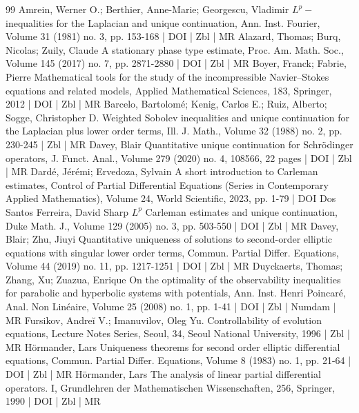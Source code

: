 \documentclass[10pt]{amsart}
\theoremstyle{definition}\newtheorem{defi}[theo]{Definition}\newtheorem{rema}[theo]{Remark}\newtheorem{exam}[theo]{Example}\newtheorem{exem}[theo]{Example}\newtheorem{nota}[theo]{Notation}
\begin{document}
\begin{thebibliography}{99}
 Amrein, Werner O.; Berthier, Anne-Marie; Georgescu, Vladimir ${L}^ p-$inequalities for the Laplacian and unique continuation, Ann. Inst. Fourier, Volume 31 (1981) no. 3, pp. 153-168 | DOI | Zbl | MR
 Alazard, Thomas; Burq, Nicolas; Zuily, Claude A stationary phase type estimate, Proc. Am. Math. Soc., Volume 145 (2017) no. 7, pp. 2871-2880 | DOI | Zbl | MR
 Boyer, Franck; Fabrie, Pierre Mathematical tools for the study of the incompressible Navier–Stokes equations and related models, Applied Mathematical Sciences, 183, Springer, 2012 | DOI | Zbl | MR
 Barcelo, Bartolomé; Kenig, Carlos E.; Ruiz, Alberto; Sogge, Christopher D. Weighted Sobolev inequalities and unique continuation for the Laplacian plus lower order terms, Ill. J. Math., Volume 32 (1988) no. 2, pp. 230-245 | Zbl | MR
 Davey, Blair Quantitative unique continuation for Schrödinger operators, J. Funct. Anal., Volume 279 (2020) no. 4, 108566, 22 pages | DOI | Zbl | MR
 Dardé, Jérémi; Ervedoza, Sylvain A short introduction to Carleman estimates, Control of Partial Differential Equations (Series in Contemporary Applied Mathematics), Volume 24, World Scientific, 2023, pp. 1-79 | DOI
 Dos Santos Ferreira, David Sharp ${L}^p$ Carleman estimates and unique continuation, Duke Math. J., Volume 129 (2005) no. 3, pp. 503-550 | DOI | Zbl | MR
 Davey, Blair; Zhu, Jiuyi Quantitative uniqueness of solutions to second-order elliptic equations with singular lower order terms, Commun. Partial Differ. Equations, Volume 44 (2019) no. 11, pp. 1217-1251 | DOI | Zbl | MR
 Duyckaerts, Thomas; Zhang, Xu; Zuazua, Enrique On the optimality of the observability inequalities for parabolic and hyperbolic systems with potentials, Ann. Inst. Henri Poincaré, Anal. Non Linéaire, Volume 25 (2008) no. 1, pp. 1-41 | DOI | Zbl | Numdam | MR
 Fursikov, Andreĭ V.; Imanuvilov, Oleg Yu. Controllability of evolution equations, Lecture Notes Series, Seoul, 34, Seoul National University, 1996 | Zbl | MR
 Hörmander, Lars Uniqueness theorems for second order elliptic differential equations, Commun. Partial Differ. Equations, Volume 8 (1983) no. 1, pp. 21-64 | DOI | Zbl | MR
 Hörmander, Lars The analysis of linear partial differential operators. I, Grundlehren der Mathematischen Wissenschaften, 256, Springer, 1990 | DOI | Zbl | MR

\end{thebibliography}
\end{document}
